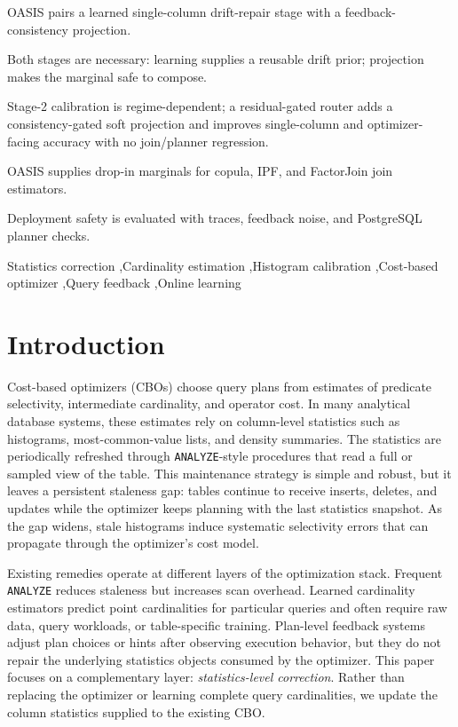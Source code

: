 \documentclass[preprint,12pt]{elsarticle}
\begin{document}
\begin{frontmatter}
\begin{highlights}
\item OASIS pairs a learned single-column drift-repair stage with a feedback-consistency projection.
\item Both stages are necessary: learning supplies a reusable drift prior; projection makes the marginal safe to compose.
\item Stage-2 calibration is regime-dependent; a residual-gated router adds a consistency-gated soft projection and improves single-column and optimizer-facing accuracy with no join/planner regression.
\item OASIS supplies drop-in marginals for copula, IPF, and FactorJoin join estimators.
\item Deployment safety is evaluated with traces, feedback noise, and PostgreSQL planner checks.
\end{highlights}

\begin{keyword}
Statistics correction \sep Cardinality estimation \sep Histogram calibration
\sep Cost-based optimizer \sep Query feedback \sep Online learning
\end{keyword}

\end{frontmatter}

\section{Introduction}
\label{sec:intro}

Cost-based optimizers (CBOs) choose query plans from estimates of predicate
selectivity, intermediate cardinality, and operator cost. In many analytical
database systems, these estimates rely on column-level statistics such as
histograms, most-common-value lists, and density summaries. The statistics are
periodically refreshed through \texttt{ANALYZE}-style procedures that read a
full or sampled view of the table. This maintenance strategy is simple and
robust, but it leaves a persistent staleness gap: tables continue to receive
inserts, deletes, and updates while the optimizer keeps planning with the last
statistics snapshot. As the gap widens, stale histograms induce systematic
selectivity errors that can propagate through the optimizer's cost model.

Existing remedies operate at different layers of the optimization stack.
Frequent \texttt{ANALYZE} reduces staleness but increases scan overhead.
Learned cardinality estimators predict point cardinalities for particular
queries and often require raw data, query workloads, or table-specific
training. Plan-level feedback systems adjust plan choices or hints after
observing execution behavior, but they do not repair the underlying statistics
objects consumed by the optimizer. This paper focuses on a complementary layer:
\emph{statistics-level correction}. Rather than replacing the optimizer or
learning complete query cardinalities, we update the column statistics supplied
to the existing CBO.
\end{document}
